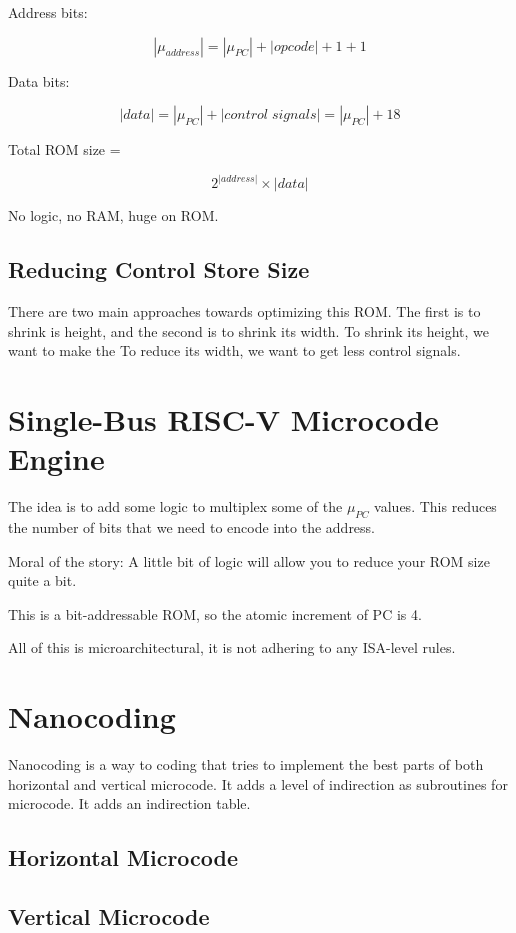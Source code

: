 Address bits:

$$|\mu_{address}| = |\mu_{PC}| + |opcode| + 1 + 1$$

Data bits:

$$|data| = |\mu_{PC}| + |control\;signals| = |\mu_{PC}| + 18$$

Total ROM size = 

$$2^{|address|} \times |data|$$

No logic, no RAM, huge on ROM.

\subsection{Reducing Control Store Size}
There are two main approaches towards optimizing this ROM.
The first is to shrink is height, and the second is to shrink its width.
To shrink its height, we want to make the 
To reduce its width, we want to get less control signals.


\section{Single-Bus RISC-V Microcode Engine}

The idea is to add some logic to multiplex some of the $\mu_{PC}$ values.
This reduces the number of bits that we need to encode into the address.

Moral of the story: 
A little bit of logic will allow you to reduce your ROM size quite a bit.

This is a bit-addressable ROM, so the atomic increment of PC is 4.

All of this is microarchitectural, it is not adhering to any ISA-level rules.

\section{Nanocoding}
Nanocoding is a way to coding that tries to implement the best parts of both horizontal and vertical microcode.
It adds a level of indirection as subroutines for microcode.
It adds an indirection table.

\subsection{Horizontal Microcode}


\subsection{Vertical Microcode}



